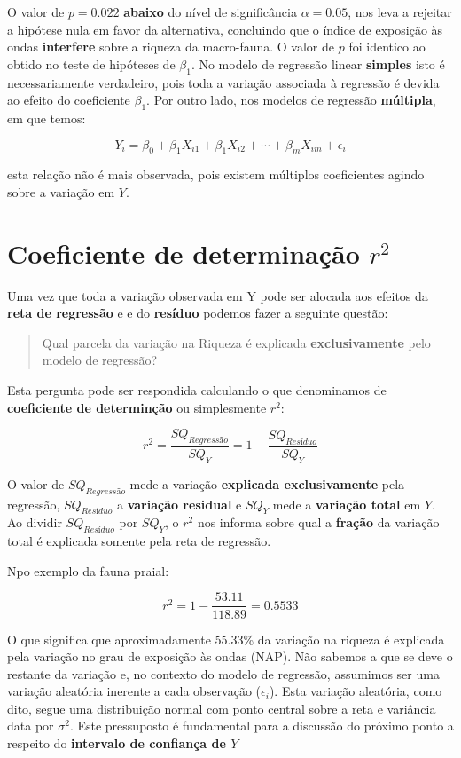 \documentclass[
]{book}
\begin{document}
O valor de \(p = 0.022\) \textbf{abaixo} do nível de significância \(\alpha = 0.05\), nos leva a rejeitar a hipótese nula em favor da alternativa, concluindo que o índice de exposição às ondas \textbf{interfere} sobre a riqueza da macro-fauna. O valor de \(p\) foi identico ao obtido no teste de hipóteses de \(\beta_1\). No modelo de regressão linear \textbf{simples} isto é necessariamente verdadeiro, pois toda a variação associada à regressão é devida ao efeito do coeficiente \(\beta_1\). Por outro lado, nos modelos de regressão \textbf{múltipla}, em que temos:

\[Y_i = \beta_0 + \beta_1X_{i1} + \beta_1X_{i2} + \cdots + \beta_mX_{im} + \epsilon_i\]

esta relação não é mais observada, pois existem múltiplos coeficientes agindo sobre a variação em \(Y\).

\hypertarget{coeficiente-de-determinauxe7uxe3o-r2}{%
\section{\texorpdfstring{Coeficiente de determinação \(r^2\)}{Coeficiente de determinação r\^{}2}}\label{coeficiente-de-determinauxe7uxe3o-r2}}

Uma vez que toda a variação observada em Y pode ser alocada aos efeitos da \textbf{reta de regressão} e e do \textbf{resíduo} podemos fazer a seguinte questão:

\begin{quote}
Qual parcela da variação na Riqueza é explicada \textbf{exclusivamente} pelo modelo de regressão?
\end{quote}

Esta pergunta pode ser respondida calculando o que denominamos de \textbf{coeficiente de determinção} ou simplesmente \(r^2\):

\[r^2 = \frac{SQ_{Regressão}}{SQ_Y} = 1 - \frac{SQ_{Resíduo}}{SQ_Y}\]

O valor de \(SQ_{Regressão}\) mede a variação \textbf{explicada exclusivamente} pela regressão, \(SQ_{Resíduo}\) a \textbf{variação residual} e \(SQ_Y\) mede a \textbf{variação total} em \(Y\). Ao dividir \(SQ_{Resíduo}\) por \(SQ_Y\), o \(r^2\) nos informa sobre qual a \textbf{fração} da variação total é explicada somente pela reta de regressão.

Npo exemplo da fauna praial:

\[r^2 = 1 - \frac{53.11}{118.89} = 0.5533\]

O que significa que aproximadamente 55.33\% da variação na riqueza é explicada pela variação no grau de exposição às ondas (NAP). Não sabemos a que se deve o restante da variação e, no contexto do modelo de regressão, assumimos ser uma variação aleatória inerente a cada observação (\(\epsilon_i\)). Esta variação aleatória, como dito, segue uma distribuição normal com ponto central sobre a reta e variância data por \(\sigma^2\). Este pressuposto é fundamental para a discussão do próximo ponto a respeito do \textbf{intervalo de confiança de \(Y\)}
\end{document}
